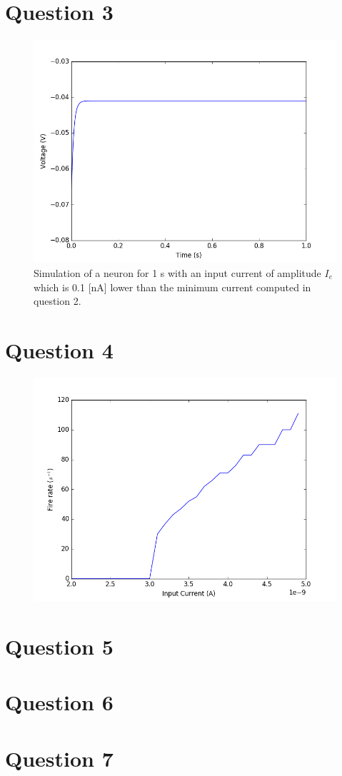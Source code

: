 \documentclass[12pt, a4paper]{article}
\begin{document}
\section*{Question 3}

\begin{figure}[H]
  \centering
  \includegraphics[width=1\linewidth]{figures/q3}
  \caption{Simulation of a neuron for 1 s with an input current of amplitude $I_e$ which is 0.1 [nA] lower than the minimum current computed in question 2.}
\end{figure}

\section*{Question 4}

\begin{figure}[H]
  \centering
  \includegraphics[width=1\linewidth]{figures/q4}
\end{figure}

\section*{Question 5}

\section*{Question 6}

\section*{Question 7}


\bibdata
\end{document}
